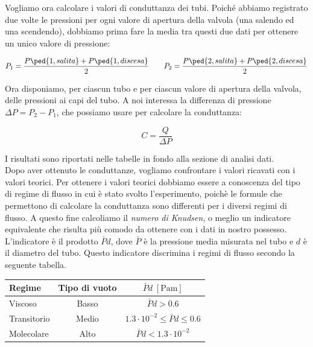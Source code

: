 Vogliamo ora calcolare i valori di conduttanza dei tubi. Poiché abbiamo registrato due volte le pressioni per ogni valore
di apertura della valvola (una salendo ed una scendendo), dobbiamo prima fare la media tra questi due dati per ottenere
un unico valore di pressione:

\begin{equation}
    P_1 = \frac{P\ped{1,salita} + P\ped{1,discesa}}{2} \qquad P_2 = \frac{P\ped{2,salita} + P\ped{2,discesa}}{2}
\end{equation}

Ora disponiamo, per ciascun tubo e per ciascun valore di apertura della valvola, delle pressioni ai capi del tubo.
A noi interessa la differenza di pressione $\Delta P = P_2 - P_1$, che possiamo usare per calcolare la conduttanza:

\begin{equation}
    C = \frac{Q}{\Delta P}
\end{equation}

I risultati sono riportati nelle tabelle in fondo alla sezione di analisi dati.\\
Dopo aver ottenuto le conduttanze, vogliamo confrontare i valori ricavati con i valori teorici.
Per ottenere i valori teorici dobbiamo essere a conoscenza del tipo di regime di flusso in cui è stato svolto l'esperimento,
poichè le formule che permettono di calcolare la conduttanza sono differenti per i diversi regimi di flusso.
A questo fine calcoliamo il \emph{numero di Knudsen}, o meglio un indicatore equivalente che risulta più comodo da
ottenere con i dati in nostro possesso. L'indicatore è il prodotto $\bar{P}d$, dove $\bar{P}$ è la pressione media misurata nel
tubo e $d$ è il diametro del tubo. Questo indicatore discrimina i regimi di flusso secondo la seguente tabella.

\begin{center}
    \small
    \begin{tabular}{l c c}
        \toprule
        Regime & Tipo di vuoto & $\bar{P} d \; [\si{\pascal\metre}]$ \\
        \midrule
        Viscoso & Basso & $\bar{P} d > 0.6$ \\
        Transitorio & Medio & $1.3\cdot10^{-2} \le \bar{P} d \le 0.6$ \\
        Molecolare & Alto & $\bar{P} d < 1.3\cdot10^{-2}$ \\
        \bottomrule
    \end{tabular}
\end{center}

